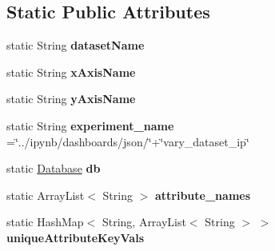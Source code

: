 \subsection*{Static Public Attributes}
\begin{DoxyCompactItemize}
\item 
\mbox{\label{classedu_1_1uiuc_1_1viz_1_1algorithms_1_1_experiment_aa3123decc7f8810d78bb2ca2b12ec089}} 
static String {\bfseries dataset\+Name}
\item 
\mbox{\label{classedu_1_1uiuc_1_1viz_1_1algorithms_1_1_experiment_a8c5b1d5f36c24465840cef0bacd8ba22}} 
static String {\bfseries x\+Axis\+Name}
\item 
\mbox{\label{classedu_1_1uiuc_1_1viz_1_1algorithms_1_1_experiment_ac040d070e1bf488783a30938cd2119f4}} 
static String {\bfseries y\+Axis\+Name}
\item 
\mbox{\label{classedu_1_1uiuc_1_1viz_1_1algorithms_1_1_experiment_aee7b59b20ef7e41159671111ea31fe59}} 
static String {\bfseries experiment\+\_\+name} =\char`\"{}../ipynb/dashboards/json/\char`\"{}+\char`\"{}vary\+\_\+dataset\+\_\+ip\char`\"{}
\item 
\mbox{\label{classedu_1_1uiuc_1_1viz_1_1algorithms_1_1_experiment_a75b2d4c705175f2c3716b6e04f27892d}} 
static \mbox{\hyperlink{classedu_1_1uiuc_1_1viz_1_1lattice_1_1_database}{Database}} {\bfseries db}
\item 
\mbox{\label{classedu_1_1uiuc_1_1viz_1_1algorithms_1_1_experiment_a39d3162e851ad4ae262fc6c4affabf7b}} 
static Array\+List$<$ String $>$ {\bfseries attribute\+\_\+names}
\item 
\mbox{\label{classedu_1_1uiuc_1_1viz_1_1algorithms_1_1_experiment_ab35e0234c8ed1256e257be5930aed766}} 
static Hash\+Map$<$ String, Array\+List$<$ String $>$ $>$ {\bfseries unique\+Attribute\+Key\+Vals}
\end{DoxyCompactItemize}


